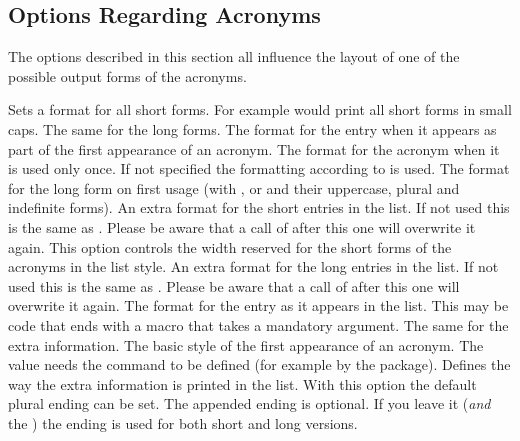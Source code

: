 \documentclass[load-preamble+]{cnltx-doc}
\begin{document}
\subsection{Options Regarding Acronyms}\label{sec:opti-regard-acronyms}
The options described in this section all influence the layout of one of the
possible output forms of the acronyms.
\begin{options}
  \Default
    Sets a format for all short forms. For example
     would print all short forms in small
    caps.
  \Default
    The same for the long forms.
  \Default
    The format for the  entry when it appears as part of the
    first appearance of an acronym.
  \Default
    The format for the acronym when it is used only once.  If not specified
    the formatting according to  is used.
  \Default
    The format for the long form on first usage (with ,  or
     and their uppercase, plural and indefinite forms).
  \Default
    An extra format for the short entries in the list.  If not used this is
    the same as .  Please be aware that a call of
     after this one will overwrite it again.
  \Default{3em}
    This option controls the width reserved for the short
    forms of the acronyms in the  list style.
  \Default
    An extra format for the long entries in the list.  If not used this is the
    same as .  Please be aware that a call of
     after this one will overwrite it again.
    \label{key:list-foreign-format}The format for the  entry
    as it appears in the list.  This may be code that ends with a macro that
    takes a mandatory argument.
  \Default
    The same for the extra information.
    The basic style of the first appearance of an acronym.  The value
     needs the command  to be defined (for
    example by the  package).
    Defines the way the extra information is printed in the list.
    With this option the default plural ending can be
    set.  The appended  ending is optional.  If you leave it
    (\emph{and} the \code{/}) the  ending is used for both short
    and long versions.
\end{options}
 
\end{document}
